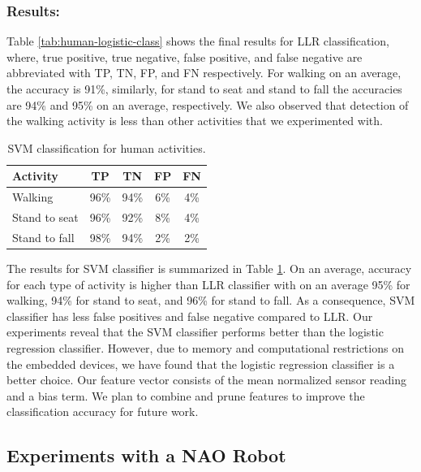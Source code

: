 \documentclass[letterpaper]{article}
\begin{document}
\begin{sloppy}
\subsubsection{Results:} Table \ref{tab:human-logistic-class} shows the final results for 
LLR classification, where, true positive, true negative, false positive, and false negative are 
abbreviated with TP, TN, FP, and FN respectively. For walking on an average, the accuracy is 91\%, 
similarly, for stand to seat and stand to fall the accuracies are 94\% and 95\% on an 
average, respectively. We also observed that detection of the walking activity is less than other 
activities that we experimented with.  

\begin{table}[!ht]
\caption{SVM classification for human activities.}
	\label{tab:human-svm-class}
	\centering
		\begin{tabular} {|l |c |c |c|c|}
			\hline
			{\bf Activity} & {\bf  TP}  &	{\bf TN}  &	{\bf FP} &	{\bf FN} \\ 
			\hline
			Walking	& 96\%	& 94\%	& 6\%	& 4\% \\ \hline
			Stand to seat	& 96\%	& 92\%	& 8\% & 	4\%	 \\ \hline 
			Stand to fall	& 98\%	& 94\%	& 2\%	& 2\%	 \\ \hline
		\end{tabular}
\end{table}


The results for SVM classifier is summarized in Table \ref{tab:human-svm-class}. On an average, 
accuracy for each type of activity is higher than LLR classifier with on an average 95\% for 
walking, 94\% for stand to seat, and 96\% for stand to fall. As a consequence, SVM classifier has 
less false positives and false negative compared to LLR.  Our experiments reveal that the SVM 
classifier performs better than the logistic regression classifier. However, due to memory and 
computational restrictions on the embedded devices, we have found that the logistic 
regression classifier is a better choice.  Our feature vector consists of the mean normalized sensor 
reading and a bias term. We plan to combine and prune features to improve the classification 
accuracy for future work.  


\subsection{Experiments with a NAO Robot}
 


\end{sloppy}
\end{document}
